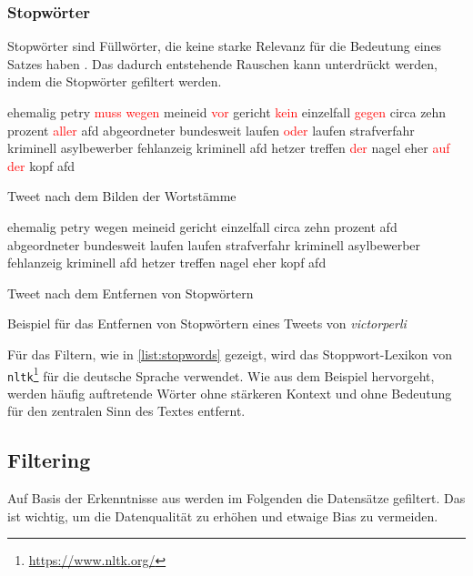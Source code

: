 \subsubsection{Stopwörter}

Stopwörter sind Füllwörter, die keine starke Relevanz für die Bedeutung eines Satzes haben \autocite[4]{kowsari_text_2019}. Das dadurch entstehende Rauschen kann unterdrückt werden, indem die Stopwörter gefiltert werden.

\begin{example}[H]
    {\footnotesize
    \begin{subexample}{0.45\textwidth}
        ehemalig petry \textcolor{red}{muss wegen} meineid \textcolor{red}{vor} gericht \textcolor{red}{kein} einzelfall \textcolor{red}{gegen} circa zehn prozent \textcolor{red}{aller} afd abgeordneter bundesweit laufen \textcolor{red}{oder} laufen strafverfahr kriminell asylbewerber fehlanzeig kriminell afd hetzer treffen \textcolor{red}{der} nagel eher \textcolor{red}{auf der} kopf afd
        \caption{Tweet nach dem Bilden der Wortstämme}
    \end{subexample}\hfill
    \begin{subexample}{0.45\textwidth}
        ehemalig petry wegen meineid gericht einzelfall circa zehn prozent afd abgeordneter bundesweit laufen laufen strafverfahr kriminell asylbewerber fehlanzeig kriminell afd hetzer treffen nagel eher kopf afd
        \caption{Tweet nach dem Entfernen von Stopwörtern}
    \end{subexample}\hfill
    }
    \caption[Beispiel -- Entfernen von Stopwörtern]{Beispiel für das Entfernen von Stopwörtern eines Tweets von \textit{victorperli} \autocite{saltzer_finding_2022}} \label{list:stopwords}
\end{example}

Für das Filtern, wie in \autoref{list:stopwords} gezeigt, wird das Stoppwort-Lexikon von \texttt{nltk}\footnote{\href{https://www.nltk.org/}{https://www.nltk.org/}} für die deutsche Sprache verwendet. Wie aus dem Beispiel hervorgeht, werden häufig auftretende Wörter ohne stärkeren Kontext und ohne Bedeutung für den zentralen Sinn des Textes entfernt.

\subsection{Filtering} \label{subsec:filtering}

Auf Basis der Erkenntnisse aus  werden im Folgenden die Datensätze gefiltert. Das ist wichtig, um die Datenqualität zu erhöhen und etwaige Bias zu vermeiden.

